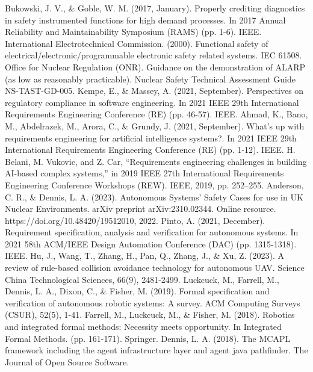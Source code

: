 \documentclass[conference]{IEEEtran}
\begin{document}
\begin{thebibliography}{00}

 Bukowski, J. V., \& Goble, W. M. (2017, January). Properly crediting diagnostics in safety instrumented functions for high demand processes. In 2017 Annual Reliability and Maintainability Symposium (RAMS) (pp. 1-6). IEEE.
 International Electrotechnical Commission. (2000). Functional safety of electrical/electronic/programmable electronic safety related systems. IEC 61508.
 Office for Nuclear Regulation (ONR). Guidance on the demonstration of ALARP (as low as reasonably practicable). Nuclear Safety Technical Assessment Guide NS-TAST-GD-005.
 Kempe, E., \& Massey, A. (2021, September). Perspectives on regulatory compliance in software engineering. In 2021 IEEE 29th International Requirements Engineering Conference (RE) (pp. 46-57). IEEE.
Ahmad, K., Bano, M., Abdelrazek, M., Arora, C., \& Grundy, J. (2021, September). What’s up with requirements engineering for artificial intelligence systems?. In 2021 IEEE 29th International Requirements Engineering Conference (RE) (pp. 1-12). IEEE.
 H. Belani, M. Vukovic, and Z. Car, “Requirements engineering challenges in building AI-based complex systems,” in 2019 IEEE 27th International Requirements Engineering Conference Workshops (REW). IEEE, 2019, pp. 252–255. 
 Anderson, C. R., \& Dennis, L. A. (2023). Autonomous Systems' Safety Cases for use in UK Nuclear Environments. arXiv preprint arXiv:2310.02344. Online resource. https://doi.org/10.48420/19512010, 2022.
 Pinto, A. (2021, December). Requirement specification, analysis and verification for autonomous systems. In 2021 58th ACM/IEEE Design Automation Conference (DAC) (pp. 1315-1318). IEEE.
 Hu, J., Wang, T., Zhang, H., Pan, Q., Zhang, J., \& Xu, Z. (2023). A review of rule-based collision avoidance technology for autonomous UAV. Science China Technological Sciences, 66(9), 2481-2499. 
 Luckcuck, M., Farrell, M., Dennis, L. A., Dixon, C., \& Fisher, M. (2019). Formal specification and verification of autonomous robotic systems: A survey. ACM Computing Surveys (CSUR), 52(5), 1-41.
 Farrell, M., Luckcuck, M., \& Fisher, M. (2018). Robotics and integrated formal methods: Necessity meets opportunity. In Integrated Formal Methods. (pp. 161-171). Springer.
Dennis, L. A. (2018). The MCAPL framework including the agent infrastructure layer and agent java pathfinder. The Journal of Open Source Software.

\end{thebibliography}
\end{document}
